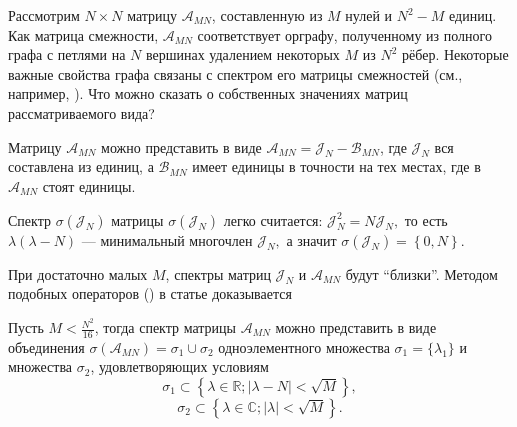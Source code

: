 Рассмотрим \( N\times N \) матрицу \( \mathscr{A}_{MN} \),
составленную из \( M \) нулей и \( N^2 - M \) единиц.
Как матрица смежности, \( \mathscr{A}_{MN} \) соответствует орграфу,
полученному из полного графа с петлями на \( N \) вершинах
удалением некоторых \( M \) из \( N^2 \) рёбер.
Некоторые важные свойства графа связаны с спектром его матрицы смежностей
(см., например, \cite{epidemic}).
Что можно сказать о собственных значениях матриц рассматриваемого вида?

Матрицу \( \mathscr{A}_{MN} \) можно представить в виде
\( \mathscr{A}_{MN} = \mathscr{J}_N - \mathscr{B}_{MN} \),
где \( \mathscr{J}_N \) вся составлена из единиц,
а \( \mathscr{B}_{MN} \) имеет единицы в точности на тех местах, где в \( \mathscr{A}_{MN} \) стоят единицы.

Спектр \( \sigma\left( \mathscr{J}_N \right) \)
матрицы \( \sigma\left(\mathscr{J}_N\right) \) легко считается:
\( \mathscr{J}_N^2 = N \mathscr{J}_N, \) то есть
\( \lambda(\lambda - N) \text{ --- минимальный многочлен } \mathscr{J}_N, \) а значит
\( \sigma\left( \mathscr{J}_N \right) = \left\{ 0,N \right\}. \)

При достаточно малых \( M \),
спектры матриц \( \mathscr{J}_N \) и \( \mathscr{A}_{MN} \) будут ``близки''.
Методом подобных операторов (\cite{baskakov-harmonic}\cite{baskakov-split})
в статье доказывается
\begin{thm*}
    Пусть \( M < \frac{N^2}{16} \),
    тогда спектр матрицы \( \mathscr{A}_{MN} \) можно представить в виде
    объединения \( \sigma\left(\mathscr{A}_{MN}\right) = \sigma_1 \cup \sigma_2 \)
    одноэлементного множества \( \sigma_1=\{\lambda_1\} \)
    и множества \( \sigma_2 \), удовлетворяющих условиям
    \[ \sigma_1 \subset \left\{ \lambda\in\mathbb{R}; \lvert \lambda - N \rvert < \sqrt{M} \right\}, \]
    \[ \sigma_2 \subset \left\{ \lambda\in\mathbb{C}; \lvert \lambda \rvert < \sqrt{M} \right\}. \]
\end{thm*}
